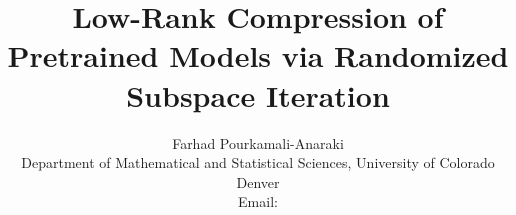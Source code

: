 \documentclass[twoside,leqno,onecolumn]{article}
\begin{document}
%

\title{\LARGE Low-Rank Compression of Pretrained Models via Randomized Subspace Iteration}%
\author{Farhad Pourkamali-Anaraki\\Department of Mathematical and Statistical Sciences, University of Colorado Denver\\
Email: }


\date{}



\maketitle

\fancyfoot[C]{\thepage}


\end{document}
